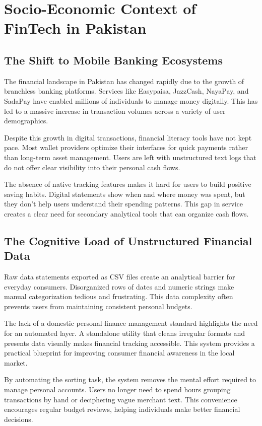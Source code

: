 \section{Socio-Economic Context of FinTech in Pakistan}

\subsection{The Shift to Mobile Banking Ecosystems}
The financial landscape in Pakistan has changed rapidly due to the growth of branchless banking platforms. Services like Easypaisa, JazzCash, NayaPay, and SadaPay have enabled millions of individuals to manage money digitally. This has led to a massive increase in transaction volumes across a variety of user demographics.

Despite this growth in digital transactions, financial literacy tools have not kept pace. Most wallet providers optimize their interfaces for quick payments rather than long-term asset management. Users are left with unstructured text logs that do not offer clear visibility into their personal cash flows.

The absence of native tracking features makes it hard for users to build positive saving habits. Digital statements show when and where money was spent, but they don't help users understand their spending patterns. This gap in service creates a clear need for secondary analytical tools that can organize cash flows.

\subsection{The Cognitive Load of Unstructured Financial Data}
Raw data statements exported as CSV files create an analytical barrier for everyday consumers. Disorganized rows of dates and numeric strings make manual categorization tedious and frustrating. This data complexity often prevents users from maintaining consistent personal budgets.

The lack of a domestic personal finance management standard highlights the need for an automated layer. A standalone utility that cleans irregular formats and presents data visually makes financial tracking accessible. This system provides a practical blueprint for improving consumer financial awareness in the local market.

By automating the sorting task, the system removes the mental effort required to manage personal accounts. Users no longer need to spend hours grouping transactions by hand or deciphering vague merchant text. This convenience encourages regular budget reviews, helping individuals make better financial decisions.


